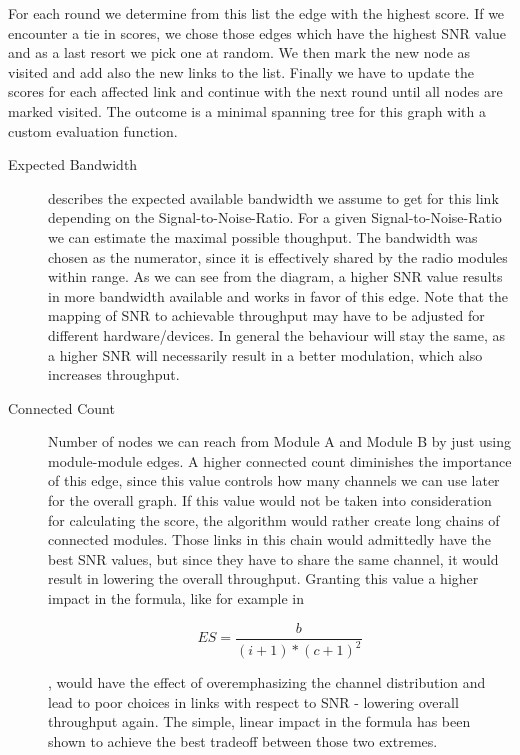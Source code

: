 	For each round we determine from this list the edge with the highest score. If we encounter a tie in scores, 
	we chose those edges which have the highest SNR value and as a last
	resort we pick one at random. We then mark the new node as visited and add also the new links to the list.
	Finally we have to update the scores for each affected link and continue with the next round until all nodes are marked visited.
	The outcome is a minimal spanning tree for this graph with a custom evaluation function.
	
	\newpage
	
	\begin{description}
	  \item[Expected Bandwidth]
	    describes the expected available bandwidth we assume to get for this link depending on the Signal-to-Noise-Ratio.
	    For a given Signal-to-Noise-Ratio we can estimate the maximal possible thoughput.
	    The bandwidth was chosen as the numerator, since it is effectively shared by the radio modules within range.
	    As we can see from the diagram, a higher SNR value results in more bandwidth available and works in favor of this edge.
	    Note that the mapping of SNR to achievable throughput may have to be adjusted for different hardware/devices. 
	    In general the behaviour will stay the same, as a higher SNR will necessarily result in a better modulation, which
	    also increases throughput.
	  
	  \item[Connected Count]
	    Number of nodes we can reach from Module A and Module B by just using module-module edges. 
	    A higher connected count diminishes the importance of this edge, since this value controls how many channels we can use later for the overall graph.
	    If this value would not be taken into consideration for calculating the score, the algorithm would rather create long chains of connected modules. 
	    Those links in this chain would admittedly have the best SNR values, but since they have to share the same channel, it would result in lowering the overall throughput.
	    Granting this value a higher impact in the formula, like for example in 
	    
	    \begin{equation}
	      ES=\frac{b}{(i + 1)* (c + 1)^2}
	    \end{equation}
	    
	    , would have the effect of overemphasizing 
	    the channel distribution and lead to poor choices in links with respect to SNR - lowering overall throughput again.
	    The simple, linear impact in the formula has been shown to achieve the best tradeoff between those two extremes.
	    

\end{description}

